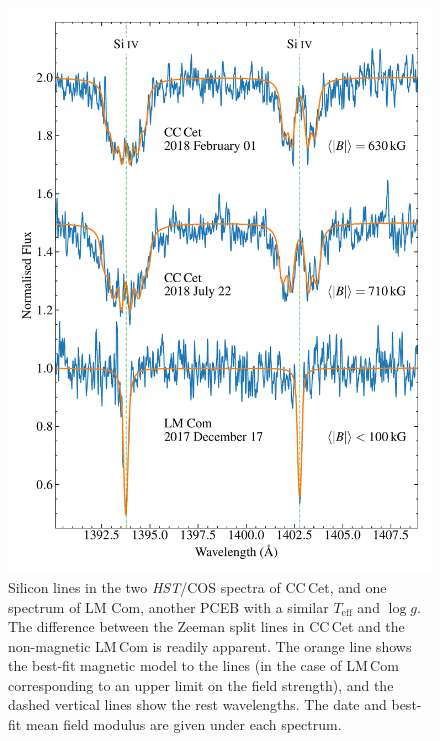 \documentclass[fleqn,usenatbib]{mnras}
\begin{document}
\begin{figure}
    \centering
    \includegraphics[width=9 cm]{siiv_lines.pdf}
    \caption{Silicon  lines in the two \textit{HST}/COS spectra of CC\,Cet, and one spectrum of LM Com, another PCEB with a similar $T_{\mathrm{eff}}$ and $\log g$. The difference between the Zeeman split lines in CC\,Cet and the non-magnetic LM\,Com is readily apparent. The orange line shows the best-fit magnetic model to the lines (in the case of LM\,Com corresponding to an upper limit on the field strength), and the dashed vertical lines show the rest wavelengths. The date and best-fit mean field modulus are given under each spectrum.}
    \label{fig:siiv_lines}
\end{figure}
\end{document}
